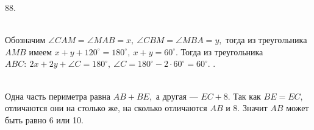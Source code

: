 88. \begin{figure}[ht!]
\end{figure}\\
Обозначим $\angle CAM=\angle MAB=x,\ \angle CBM=\angle MBA=y,$ тогда из треугольника $AMB$ имеем $x+y+120^\circ=180^\circ,\ x+y=60^\circ.$ Тогда из треугольника $ABC:\ 2x+2y+\angle C=180^\circ,\ \angle C=180^\circ-2\cdot60^\circ=60^\circ.$\newpage
{}. \begin{figure}[ht!]
\end{figure}\\
Одна часть периметра равна $AB+BE,$ а другая --- $EC+8.$ Так как $BE=EC,$ отличаются они на столько же, на сколько отличаются $AB$ и 8. Значит $AB$ может быть равно 6 или 10.\\
